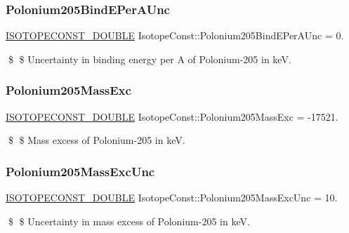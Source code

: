 \subsubsection{\texorpdfstring{Polonium205\+Bind\+E\+Per\+A\+Unc}{Polonium205BindEPerAUnc}}
{\footnotesize\ttfamily \mbox{\hyperlink{group___isotope_const-_macros_ga8f45a7272ce02c0b4c65c44636ed719a}{I\+S\+O\+T\+O\+P\+E\+C\+O\+N\+S\+T\+\_\+\+D\+O\+U\+B\+LE}} Isotope\+Const\+::\+Polonium205\+Bind\+E\+Per\+A\+Unc = 0.}

\$ \$ Uncertainty in binding energy per A of Polonium-\/205 in keV. \mbox{\label{group___isotope_const-_polonium-_po205_ga86f02e028813e633bfa20f85a3f6dea0}} 
\subsubsection{\texorpdfstring{Polonium205\+Mass\+Exc}{Polonium205MassExc}}
{\footnotesize\ttfamily \mbox{\hyperlink{group___isotope_const-_macros_ga8f45a7272ce02c0b4c65c44636ed719a}{I\+S\+O\+T\+O\+P\+E\+C\+O\+N\+S\+T\+\_\+\+D\+O\+U\+B\+LE}} Isotope\+Const\+::\+Polonium205\+Mass\+Exc = -\/17521.}

\$ \$ Mass excess of Polonium-\/205 in keV. \mbox{\label{group___isotope_const-_polonium-_po205_ga8015c3a716d856a6403ff79e87ab8c8f}} 
\subsubsection{\texorpdfstring{Polonium205\+Mass\+Exc\+Unc}{Polonium205MassExcUnc}}
{\footnotesize\ttfamily \mbox{\hyperlink{group___isotope_const-_macros_ga8f45a7272ce02c0b4c65c44636ed719a}{I\+S\+O\+T\+O\+P\+E\+C\+O\+N\+S\+T\+\_\+\+D\+O\+U\+B\+LE}} Isotope\+Const\+::\+Polonium205\+Mass\+Exc\+Unc = 10.}

\$ \$ Uncertainty in mass excess of Polonium-\/205 in keV. \mbox{\label{group___isotope_const-_polonium-_po205_gaff3d5beacfd909cbc6be30841a01f6a0}} 
